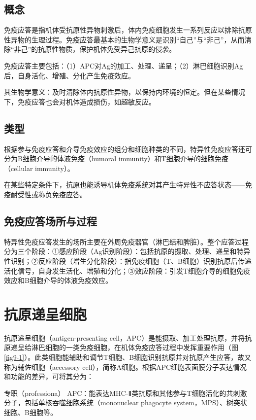 \subsection{概念}

免疫应答是指机体受抗原性异物刺激后，体内免疫细胞发生一系列反应以排除抗原性异物的生理过程。免疫应答最基本的生物学意义是识别“自己”与“非己”，从而清除“非己”的抗原性物质，保护机体免受异己抗原的侵袭。

免疫应答主要包括：（1）APC对Ag的加工、处理、递呈；（2）淋巴细胞识别Ag后，自身活化、增殖、分化产生免疫效应。

其生物学意义：及时清除体内抗原性异物，以保持内环境的恒定。但在某些情况下，免疫应答也会对机体造成损伤，如超敏反应。


\subsection{类型}

根据参与免疫应答和介导免疫效应的组分和细胞种类的不同，特异性免疫应答还可分为B细胞介导的体液免疫（humoral
immunity）和T细胞介导的细胞免疫（cellular immunity）。

在某些特定条件下，抗原也能诱导机体免疫系统对其产生特异性不应答状态------免疫耐受性或称负免疫应答。


\subsection{免疫应答场所与过程}

特异性免疫应答发生的场所主要在外周免疫器官（淋巴结和脾脏）。整个应答过程分为三个阶段：①感应阶段（Ag识别阶段）：包括抗原的摄取、处理、递呈和特异性识别；②反应阶段（增生分化阶段）：指免疫细胞（T、B细胞）识别抗原后传递活化信号，自身发生活化、增殖和分化；③效应阶段：引发T细胞介导的细胞免疫效应和B细胞介导的体液免疫效应。

\section{抗原递呈细胞}

抗原递呈细胞（antigen-presenting
cell，APC）是能摄取、加工处理抗原，并将抗原递呈给淋巴细胞的一类免疫细胞，在机体免疫应答过程中发挥重要作用（图\ref{fig9-1}）。此类细胞能辅助和调节T细胞、B细胞识别抗原并对抗原产生应答，故又称为辅佐细胞（accessory
cell），简称A细胞。根据APC细胞表面膜分子表达情况和功能的差异，可将其分为：

专职（professiona）
APC：能表达MHC-Ⅱ类抗原和其他参与T细胞活化的共刺激分子，包括单核吞噬细胞系统（mononuclear
phagocyte system，MPS）、树突状细胞、B细胞等。

